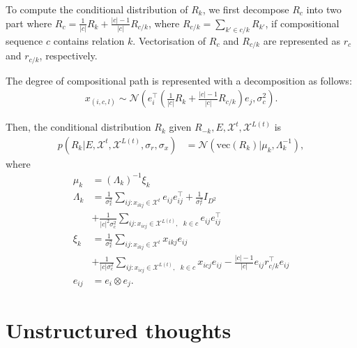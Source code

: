 \documentclass{article}
\begin{document}
To compute the conditional distribution of $R_k$, we first decompose $R_c$ into two part where $R_c = \frac{1}{|c|} R_k + \frac{|c|-1}{|c|}R_{c/k}$, where $R_{c/k} = \sum_{k' \in c/k} R_{k'}$, if compositional sequence $c$ contains relation $k$. Vectorisation of $R_c$ and $R_{c/k}$ are represented as $r_c$ and $r_{c/k}$, respectively.

The degree of compositional path is represented with a decomposition as follows:
\begin{align}
x_{(i, c, l)} \sim \mathcal{N}(e_i^\top (\frac{1}{|c|} R_k + \frac{|c|-1}{|c|}R_{c/k}) e_j, \sigma_{c}^2).
\end{align}

Then, the conditional distribution $R_k$ given $R_{-k}, E, \mathcal{X}^{t}, \mathcal{X}^{L(t)}$ is
\begin{align}
p(R_k|E, \mathcal{X}^{t}, \mathcal{X}^{L(t)}, \sigma_r, \sigma_x)  &= \mathcal{N}(\text{vec}(R_k) | \mu_k, \Lambda_k^{-1}),
\end{align}
where
\begin{align*}
\mu_k &=(\Lambda_k)^{-1}\xi_k \\
\Lambda_k &= \frac{1}{\sigma_x^2} \sum_{ij:x_{ikj} \in \mathcal{X}^{t}} e_{ij}e_{ij}^\top + \frac{1}{\sigma_r^2} {I}_{D^2} \\
& +\frac{1}{|c|^2 \sigma_c^2} \sum_{ij:x_{icj} \in \mathcal{X}^{L(t)},\text{ }k \in c} e_{ij} e_{ij}^\top \\
\xi_k &=  \frac{1}{\sigma_x^2}\sum_{ij:x_{ikj} \in \mathcal{X}^{t}} x_{ikj} e_{ij}\\
& +\frac{1}{|c| \sigma_c^2} \sum_{ij:x_{icj} \in \mathcal{X}^{L(t)},\text{ }k \in c} x_{icj} e_{ij} - \frac{|c|-1}{|c|} e_{ij} r_{c/k}^\top e_{ij}\\
e_{ij} &= e_{i} \otimes e_{j}.
\end{align*}

\section{Unstructured thoughts}
\end{document}

